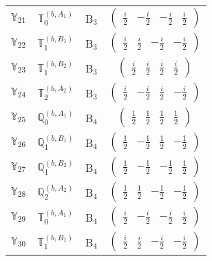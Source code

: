 \documentclass[fleqn,10pt,landscape]{article}
\begin{document}
\begin{itemize}
\begin{center}
\begin{longtable}{c|c|c|c}
$ \mathbb{Y}_{21} $ & $\mathbb{T}_{0}^{(b,A_{1})}$ & B$_{3}$ & $\begin{pmatrix} \frac{i}{2} & - \frac{i}{2} & - \frac{i}{2} & \frac{i}{2} \end{pmatrix}$ \\
$ \mathbb{Y}_{22} $ & $\mathbb{T}_{1}^{(b,B_{1})}$ & B$_{3}$ & $\begin{pmatrix} \frac{i}{2} & \frac{i}{2} & - \frac{i}{2} & - \frac{i}{2} \end{pmatrix}$ \\
$ \mathbb{Y}_{23} $ & $\mathbb{T}_{1}^{(b,B_{2})}$ & B$_{3}$ & $\begin{pmatrix} \frac{i}{2} & \frac{i}{2} & \frac{i}{2} & \frac{i}{2} \end{pmatrix}$ \\
$ \mathbb{Y}_{24} $ & $\mathbb{T}_{2}^{(b,A_{2})}$ & B$_{3}$ & $\begin{pmatrix} \frac{i}{2} & - \frac{i}{2} & \frac{i}{2} & - \frac{i}{2} \end{pmatrix}$ \\ \hline
$ \mathbb{Y}_{25} $ & $\mathbb{Q}_{0}^{(b,A_{1})}$ & B$_{4}$ & $\begin{pmatrix} \frac{1}{2} & \frac{1}{2} & \frac{1}{2} & \frac{1}{2} \end{pmatrix}$ \\
$ \mathbb{Y}_{26} $ & $\mathbb{Q}_{1}^{(b,B_{1})}$ & B$_{4}$ & $\begin{pmatrix} \frac{1}{2} & - \frac{1}{2} & \frac{1}{2} & - \frac{1}{2} \end{pmatrix}$ \\
$ \mathbb{Y}_{27} $ & $\mathbb{Q}_{1}^{(b,B_{2})}$ & B$_{4}$ & $\begin{pmatrix} \frac{1}{2} & - \frac{1}{2} & - \frac{1}{2} & \frac{1}{2} \end{pmatrix}$ \\
$ \mathbb{Y}_{28} $ & $\mathbb{Q}_{2}^{(b,A_{2})}$ & B$_{4}$ & $\begin{pmatrix} \frac{1}{2} & \frac{1}{2} & - \frac{1}{2} & - \frac{1}{2} \end{pmatrix}$ \\
$ \mathbb{Y}_{29} $ & $\mathbb{T}_{0}^{(b,A_{1})}$ & B$_{4}$ & $\begin{pmatrix} \frac{i}{2} & - \frac{i}{2} & - \frac{i}{2} & \frac{i}{2} \end{pmatrix}$ \\
$ \mathbb{Y}_{30} $ & $\mathbb{T}_{1}^{(b,B_{1})}$ & B$_{4}$ & $\begin{pmatrix} \frac{i}{2} & \frac{i}{2} & - \frac{i}{2} & - \frac{i}{2} \end{pmatrix}$ \\

\end{longtable}
\end{center}
\end{itemize}
\end{document}
